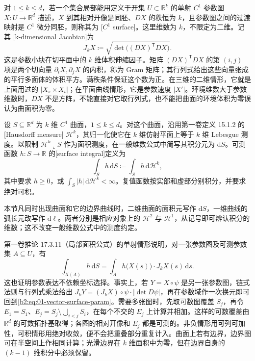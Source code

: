 \ProseParagraphBreak

对 \(1\leq k\leq d\)，若一个集合局部能用定义于开集 \(U\subset\mathbb R^k\) 的单射 \(C^1\) 参数图 \(X:U\rightarrow\mathbb R^d\) 描述，\(X\) 到其相对开像是同胚、\(DX\) 的秩恒为 \(k\)，且参数图之间的过渡映射是 \(C^1\) 微分同胚，则称其为 [\(C^1\) surface]。这里维数为 \(k\)，不限定为二维。记其 [k-dimensional Jacobian]为
\[
 J_kX\coloneqq\sqrt{\det\bigl((DX)^{\mathsf T}DX\bigr)}.
\]
这是参数小块在切平面中的 \(k\) 维体积伸缩因子。矩阵 \((DX)^{\mathsf T}DX\) 的第 \((i,j)\) 项是两个切向量 \(\partial_iX,\partial_jX\) 的内积，称为 Gram 矩阵；其行列式给出这些向量张成的平行多面体的体积平方。满秩条件保证这个数为正。在三维的二维情形，它就是上面用过的 \(|X_s\times X_t|\)；在平面曲线情形，它是参数速度 \(|X'|\)。环境维数大于参数维数时，\(DX\) 不是方阵，不能直接对它取行列式，也不能把曲面的环境体积为零误认为曲面积为零。

\begin{definition}\label{b2:def:01-vector-surface-integral}
设 \(S\subseteq\mathbb R^d\) 为 \(k\) 维 \(C^1\) 曲面，\(1\leq k\leq d\)。对这个曲面，沿用第一卷定义 15.1.2 的[Hausdorff measure] \(\mathcal H^k\)，其归一化使它在 \(k\) 维仿射平面上等于 \(k\) 维 Lebesgue 测度。以限制 \(\mathcal H^k\llcorner S\) 作为面积测度，在一般维数公式中简写其积分元为 \(\mathrm dS\)。可测函数 \(h:S\rightarrow\mathbb R\) 的[surface integral]定义为
\[
 \int_Sh\,\mathrm dS\coloneqq\int_Sh\,\mathrm d\mathcal H^k,
\]
其中要求 \(h\geq0\)，或 \(\int_S|h|\,\mathrm d\mathcal H^k<\infty\)。复值函数按实部和虚部分别积分，并要求绝对可积。
\end{definition}

本节凡同时出现曲面和它的边界曲线时，二维曲面的面积元写作 \(\mathrm dS\)，一维曲线的弧长元改写作 \(\mathrm d\ell\)。两者分别是相应对象上的 \(\mathcal H^2\) 与 \(\mathcal H^1\)，从记号即可辨认积分的维数；这不改变一般维数公式中的测度约定。

第一卷推论 17.3.11（局部面积公式）的单射情形说明，对一张参数图及可测参数集 \(A\subseteq U\)，有
\begin{equation}\label{b2:eq:01-vector-surface-param}
 \int_{X(A)}h\,\mathrm dS
 =\int_A h\bigl(X(s)\bigr)\cdot J_kX(s)\,\mathrm ds.
\end{equation}
这也证明参数表达不依赖坐标选择。事实上，若 \(Y=X\circ\psi\) 是另一张参数图，链式法则与行列式乘法给出 \(J_kY=(J_kX)\circ\psi\cdot|\det D\psi|\)，再在参数域作一次换元即可回到\eqref{b2:eq:01-vector-surface-param}。需要多张图时，先取可数图覆盖 \(S_j\)，再令 \(E_1=S_1\)、\(E_j=S_j\setminus\bigcup_{i<j}S_i\)，在每个不交的 \(E_j\) 上计算并相加。这样的可数覆盖由 \(\mathbb R^d\) 的可数拓扑基取得；各图的相对开像和 \(E_j\) 都是可测的。非负情形用可列可加性，可积情形用绝对收敛，便不会把重叠部分重复计入。曲面上若有边界，边界图可在半空间上作相同计算；光滑边界在 \(k\) 维面积中为零，但在边界自身的 \((k-1)\) 维积分中必须保留。

